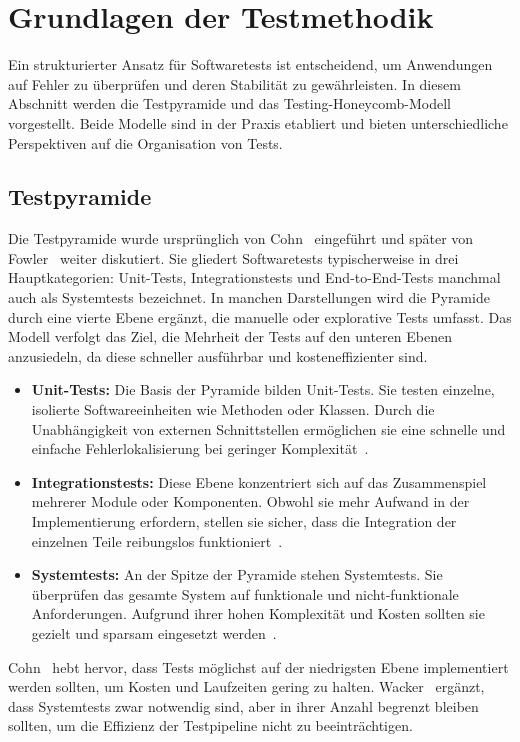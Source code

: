 \section{Grundlagen der Testmethodik}
Ein strukturierter Ansatz für Softwaretests ist entscheidend, um Anwendungen auf Fehler zu überprüfen und deren Stabilität zu gewährleisten. In diesem Abschnitt werden die Testpyramide und das Testing-Honeycomb-Modell vorgestellt. Beide Modelle sind in der Praxis etabliert und bieten unterschiedliche Perspektiven auf die Organisation von Tests.

\subsection{Testpyramide}
Die Testpyramide wurde ursprünglich von Cohn~\cite{Coh09} eingeführt und später von Fowler~\cite{Fow12} weiter diskutiert. Sie gliedert Softwaretests typischerweise in drei Hauptkategorien: Unit-Tests, Integrationstests und End-to-End-Tests manchmal auch als Systemtests bezeichnet. In manchen Darstellungen wird die Pyramide durch eine vierte Ebene ergänzt, die manuelle oder explorative Tests umfasst. Das Modell verfolgt das Ziel, die Mehrheit der Tests auf den unteren Ebenen anzusiedeln, da diese schneller ausführbar und kosteneffizienter sind.

\begin{itemize}
	\item \textbf{Unit-Tests:} Die Basis der Pyramide bilden Unit-Tests. Sie testen einzelne, isolierte Softwareeinheiten wie Methoden oder Klassen. Durch die Unabhängigkeit von externen Schnittstellen ermöglichen sie eine schnelle und einfache Fehlerlokalisierung bei geringer Komplexität~\cite{BF14}.
	\item \textbf{Integrationstests:} Diese Ebene konzentriert sich auf das Zusammenspiel mehrerer Module oder Komponenten. Obwohl sie mehr Aufwand in der Implementierung erfordern, stellen sie sicher, dass die Integration der einzelnen Teile reibungslos funktioniert~\cite{Wac15}.
	\item \textbf{Systemtests:} An der Spitze der Pyramide stehen Systemtests. Sie überprüfen das gesamte System auf funktionale und nicht-funktionale Anforderungen. Aufgrund ihrer hohen Komplexität und Kosten sollten sie gezielt und sparsam eingesetzt werden~\cite{BF14}.
\end{itemize}

Cohn~\cite{Coh09} hebt hervor, dass Tests möglichst auf der niedrigsten Ebene implementiert werden sollten, um Kosten und Laufzeiten gering zu halten. Wacker~\cite{Wac15} ergänzt, dass Systemtests zwar notwendig sind, aber in ihrer Anzahl begrenzt bleiben sollten, um die Effizienz der Testpipeline nicht zu beeinträchtigen.

